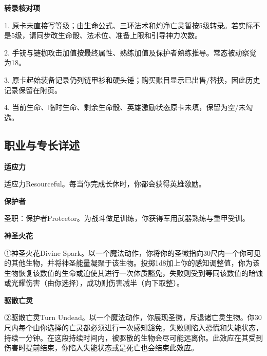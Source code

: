 \documentclass[letterpaper,openany,twoside,twocolumn]{book}
\begin{document}
\par\noindent\textbf{转录核对项}\par
1. 原卡未直接写等级；由生命公式、三环法术和灼净亡灵暂按5级转录。若实际不是5级，请同步改生命骰、法术位、准备上限和引导神力次数。\par
2. 手铳与链枷攻击加值按最终属性、熟练加值及保护者熟练推导。常态被动察觉为18。\par
3. 原卡起始装备记录仍列链甲衫和硬头锤；购买账目显示已出售/替换，因此历史记录保留在附页。\par
4. 当前生命、临时生命、剩余生命骰、英雄激励状态原卡未填，保留为空/未勾选。\par


\subsection*{职业与专长详述}

\par\noindent\textbf{适应力}\par
适应力Resourceful。每当你完成长休时，你都会获得英雄激励。\par


\par\noindent\textbf{保护者}\par
圣职：保护者Protcetor。为战斗做足训练，你获得军用武器熟练与重甲受训。\par


\par\noindent\textbf{神圣火花}\par
①神圣火花Divine Spark。以一个魔法动作，你将你的圣徽指向30尺内一个你可见的其他生物，并将神圣能量凝聚于该生物。投掷1d8加上你的感知调整值，你为该生物恢复该数值的生命或迫使其进行一次体质豁免，失败则受到等同该数值的暗蚀或光耀伤害（由你选择），成功则伤害减半（向下取整）。\par


\par\noindent\textbf{驱散亡灵}\par
②驱散亡灵Turn Undead。以一个魔法动作，你展现圣徽，斥退诸亡灵生物。你30尺内每个由你选择的亡灵都必须进行一次感知豁免，失败则陷入恐慌和失能状态，持续一分钟。在这段持续时间内，被驱散的生物会尽可能远离你。此效应在其受到伤害时提前结束，你陷入失能状态或是死亡也会结束此效应。\par
\end{document}
